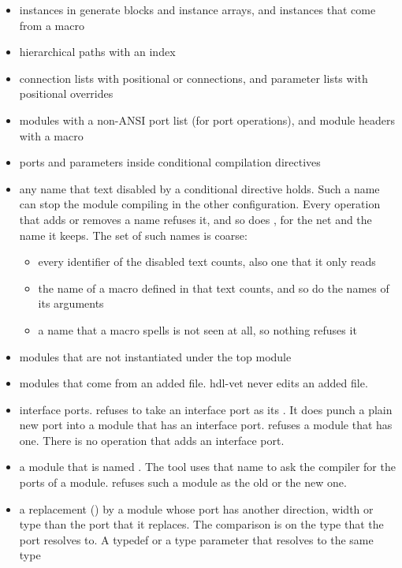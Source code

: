 \begin{itemize}
\item instances in generate blocks and instance arrays, and instances that come from a
  macro
\item hierarchical paths with an index
\item connection lists with positional or  connections, and parameter lists
  with positional overrides
\item modules with a non-ANSI port list (for port operations), and module headers with
  a macro
\item ports and parameters inside conditional compilation directives
\item any name that text disabled by a conditional directive holds. Such a name can stop
  the module compiling in the other configuration. Every operation that adds or removes a
  name refuses it, and so does , for the net and the name it
  keeps. The set of such names is coarse:
  \begin{itemize}
  \item every identifier of the disabled text counts, also one that it only reads
  \item the name of a macro defined in that text counts, and so do the names of its
    arguments
  \item a name that a macro spells is not seen at all, so nothing refuses it
  \end{itemize}
\item modules that are not instantiated under the top module
\item modules that come from an added file. hdl-vet never edits an added file.
\item interface ports.  refuses to take an interface port as its
  . It does punch a plain new port into a module that has an interface port.
   refuses a module that has one. There is no operation
  that adds an interface port.
\item a module that is named . The tool uses that name to ask the
  compiler for the ports of a module.  refuses such a module
  as the old or the new one.
\item a replacement () by a module whose port has another
  direction, width or type than the port that it replaces. The comparison is on the type
  that the port resolves to. A typedef or a type parameter that resolves to the same type

\end{itemize}
